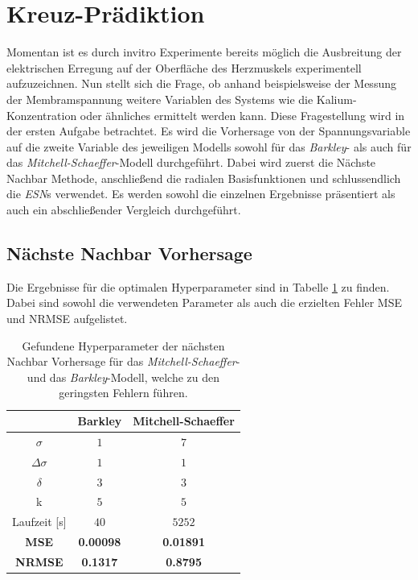 \section{Kreuz-Prädiktion}
\label{sec:exp_cross_pred}
Momentan ist es durch invitro Experimente bereits möglich die Ausbreitung der elektrischen Erregung auf der Oberfläche des Herzmuskels experimentell aufzuzeichnen. Nun stellt sich die Frage, ob anhand beispielsweise der Messung der Membramspannung weitere Variablen des Systems wie die Kalium-Konzentration oder ähnliches ermittelt werden kann. Diese Fragestellung wird in der ersten Aufgabe betrachtet. Es wird die Vorhersage von der Spannungsvariable auf die zweite Variable des jeweiligen Modells sowohl für das \textit{Barkley}- als auch für das \textit{Mitchell-Schaeffer}-Modell durchgeführt. Dabei wird zuerst die Nächste Nachbar Methode, anschließend die radialen Basisfunktionen und schlussendlich die \textit{ESN}s verwendet. Es werden sowohl die einzelnen Ergebnisse präsentiert als auch ein abschließender Vergleich durchgeführt.
 
\subsection{Nächste Nachbar Vorhersage}
Die Ergebnisse für die optimalen Hyperparameter sind in Tabelle \ref{tab:exp_cross_nn_results} zu finden. Dabei sind sowohl die verwendeten Parameter als auch die erzielten Fehler MSE und NRMSE aufgelistet.
\begin{table}[h]
	\centering

	\begin{tabular}{|c|c|c|}
		\multicolumn{1}{c|}{} & Barkley & Mitchell-Schaeffer \\ 
		\hline \hline 
		\rule[-1ex]{0pt}{2.5ex} $\sigma$ & $1$ & $7$ \\ 
		\hline 
		\rule[-1ex]{0pt}{2.5ex} $\Delta \sigma$ & $1$ & $1$ \\ 
		\hline 
		\rule[-1ex]{0pt}{2.5ex} $\delta$ & $3$ & $3$ \\ 
		\hline 
		\rule[-1ex]{0pt}{2.5ex} k & $5$ & $5$ \\ 
		\hline 
		\rule[-1ex]{0pt}{2.5ex} Laufzeit [s] & $40$ & $5252$ \\ 
		\hline 
		\rule[-1ex]{0pt}{2.5ex} \textbf{MSE} & \textbf{0.00098} & \textbf{0.01891} \\ 
		\hline 
		\rule[-1ex]{0pt}{2.5ex} \textbf{NRMSE} & \textbf{0.1317} & \textbf{0.8795} \\ 
		\hline 
	\end{tabular} 

	\caption{Gefundene Hyperparameter der nächsten Nachbar Vorhersage für das \textit{Mitchell-Schaeffer}- und das \textit{Barkley}-Modell, welche zu den geringsten Fehlern führen.}
\label{tab:exp_cross_nn_results}
\end{table} 


